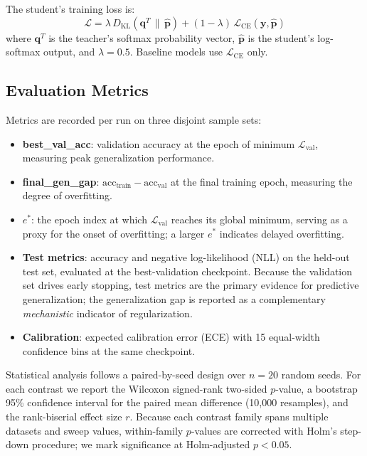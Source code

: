 \documentclass[a4paper,fleqn]{cas-dc}
\begin{document}
The student's training loss is:
\begin{equation}
  \mathcal{L} = \lambda\,D_{\mathrm{KL}}\!\left(
    \mathbf{q}^T \,\|\, \hat{\mathbf{p}}
  \right)
  + (1-\lambda)\,\mathcal{L}_{\mathrm{CE}}(\mathbf{y},\hat{\mathbf{p}})
\end{equation}
where $\mathbf{q}^T$ is the teacher's softmax probability vector,
$\hat{\mathbf{p}}$ is the student's log-softmax output,
and $\lambda = 0.5$. Baseline models use $\mathcal{L}_{\mathrm{CE}}$
only.

\subsection{Evaluation Metrics}

Metrics are recorded per run on three disjoint sample sets:

\begin{itemize}
  \item \textbf{best\_val\_acc}: validation accuracy at the epoch
        of minimum $\mathcal{L}_{\mathrm{val}}$, measuring peak
        generalization performance.
  \item \textbf{final\_gen\_gap}:
        $\mathrm{acc}_{\mathrm{train}} - \mathrm{acc}_{\mathrm{val}}$
        at the final training epoch, measuring the degree of
        overfitting.
  \item $e^*$: the epoch index at which $\mathcal{L}_{\mathrm{val}}$
        reaches its global minimum, serving as a proxy for the
        onset of overfitting; a larger $e^*$ indicates delayed
        overfitting.
  \item \textbf{Test metrics}: accuracy and negative log-likelihood
        (NLL) on the held-out test set, evaluated at the best-validation
        checkpoint. Because the validation set drives early stopping,
        test metrics are the primary evidence for predictive
        generalization; the generalization gap is reported as a
        complementary \emph{mechanistic} indicator of regularization.
  \item \textbf{Calibration}: expected calibration error (ECE) with 15
        equal-width confidence bins at the same checkpoint.
\end{itemize}

Statistical analysis follows a paired-by-seed design over $n=20$ random
seeds. For each contrast we report the Wilcoxon signed-rank two-sided
$p$-value, a bootstrap 95\% confidence interval for the paired mean
difference (10{,}000 resamples), and the rank-biserial effect size $r$.
Because each contrast family spans multiple datasets and sweep values,
within-family $p$-values are corrected with Holm's step-down procedure;
we mark significance at Holm-adjusted $p<0.05$.
\end{document}
